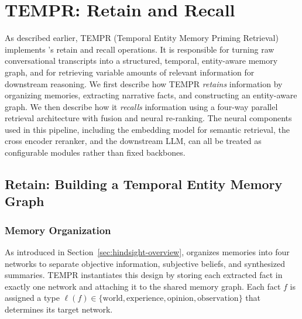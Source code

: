\section{TEMPR: Retain and Recall}
\label{sec:tempr}

As described earlier, TEMPR (Temporal Entity Memory Priming Retrieval) implements \our's retain and recall operations. It is responsible for turning raw conversational transcripts into a structured, temporal, entity-aware memory graph, and for retrieving variable amounts of relevant information for downstream reasoning. 
%
We first describe how TEMPR \emph{retains} information by organizing memories, extracting narrative facts, and constructing an entity-aware graph. We then describe how it \emph{recalls} information using a four-way parallel retrieval architecture with fusion and neural re-ranking. The neural components used in this pipeline, including the embedding model for semantic retrieval, the cross encoder reranker, and the downstream LLM, can all be treated as configurable modules rather than fixed backbones.

\subsection{Retain: Building a Temporal Entity Memory Graph}
\label{sec:tempr-retain}

\subsubsection{Memory Organization}
\label{sec:memory-organization}

As introduced in Section~\ref{sec:hindsight-overview}, \our organizes memories into four networks to separate objective information, subjective beliefs, and synthesized summaries. TEMPR instantiates this design by storing each extracted fact in exactly one network and attaching it to the shared memory graph. Each fact $f$ is assigned a type $\ell(f) \in \{\text{world}, \text{experience}, \text{opinion}, \text{observation}\}$ that determines its target network.


